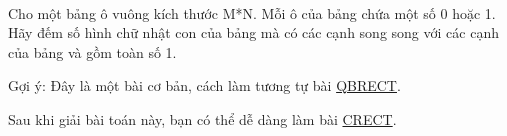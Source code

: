  

Cho một bảng ô vuông kích thước M*N. Mỗi ô của bảng chứa một số 0 hoặc 1. Hãy đếm số hình chữ nhật con của bảng mà có các cạnh song song với các cạnh của bảng và gồm toàn số 1.

Gợi ý: Đây là một bài cơ bản, cách làm tương tự bài \href{http://vnoi.info/problems/show/QBRECT/}{ QBRECT}.

Sau khi giải bài toán này, bạn có thể dễ dàng làm bài \href{http://vnoi.info/problems/show/CRECT/}{ CRECT}.